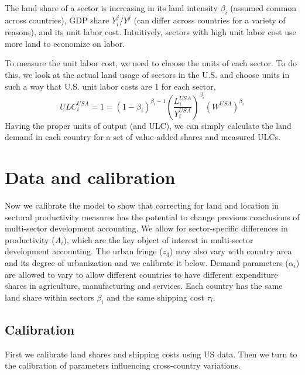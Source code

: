 \documentclass[12pt]{article}
\begin{document}
The land share of a sector is increasing in its land intensity $\beta_i$ (assumed common across countries), GDP share ${Y_i^j}/{Y^j}$ (can differ across countries for a variety of reasons), and its unit labor cost. Intuitively, sectors with high unit labor cost use more land to economize on labor.

To measure the unit labor cost, we need to choose the units of each sector. To do this, we look at the actual land usage of sectors in the U.S. and choose units in such a way that U.S. unit labor costs are 1 for each sector,
\begin{equation}
\label{eq:US_ULC}
ULC_i^{USA} =1=(1-\beta_i)^{\beta_i-1} \left(\frac{L_i^{USA}}{Y_i^{USA}}\right)^{\beta_i}(W^{USA})^{\beta_i}
\end{equation}
Having the proper units of output (and ULC), we can simply calculate the land demand in each country for a set of value added shares and measured ULCs.





\section{Data and calibration}
Now we calibrate the model to show that correcting for land and location in sectoral productivity measures has the potential to change previous conclusions of multi-sector development accounting.
We allow for sector-specific differences in productivity ($A_i$), which are the key object of interest in multi-sector development accounting. The urban fringe ($z_3$) may also vary with country area and its degree of urbanization and we calibrate it below. Demand parameters ($\alpha_i$) are allowed to vary to allow different countries to have different expenditure shares in agriculture, manufacturing and services. %
Each country has the same land share within sectors $\beta_i$ and the same shipping cost $\tau_i$.

\subsection{Calibration}
First we calibrate land shares and shipping costs using US data. Then we turn to the calibration of parameters influencing cross-country variations.
\end{document}
